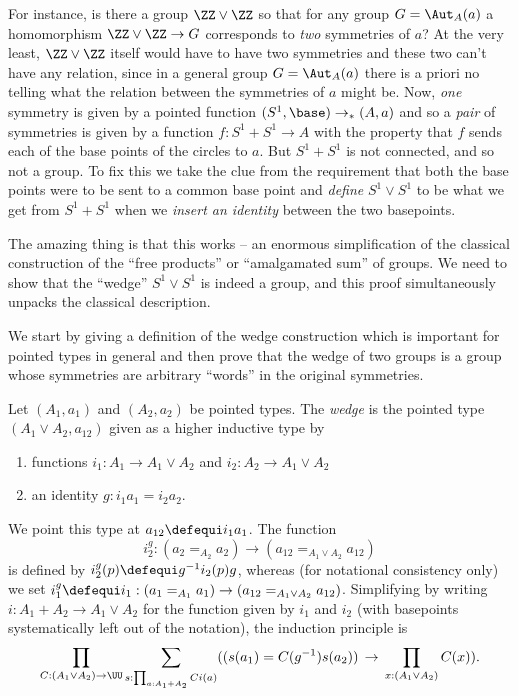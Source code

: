For instance, is there a group $\ZZ\vee\ZZ$ so that for any group $G=\Aut_A(a)$ a homomorphism $\ZZ\vee\ZZ\to G$ corresponds to \emph{two} symmetries of $a$?
At the very least, $\ZZ\vee\ZZ$ itself would have to have two symmetries and these two can't have any relation, since in a general group $G=\Aut_A(a)$ there is a priori no telling what the relation between the symmetries of $a$ might be.
Now, \emph{one} symmetry is given by a pointed function $(S^1,\base)\to_*(A,a)$ and so a \emph{pair} of symmetries is given by a function $f:S^1+S^1\to A$ with the property that $f$ sends each of the base points of the circles to $a$.  But $S^1+S^1$ is not connected, and so not a group.  To fix this we take the clue from the requirement that both the base points were to be sent to a common base point and \emph{define} $S^1\vee S^1$ to be what we get from $S^1+S^1$ when we \emph{insert an identity} between the two basepoints.

The amazing thing is that this works -- an enormous simplification of the classical construction of the ``free products'' or ``amalgamated sum'' of groups.  We need to show that the ``wedge'' $S^1\vee S^1$ is indeed a group, and this proof simultaneously unpacks the classical description.

We start by giving a definition of the wedge construction which is important for pointed types in general and then prove that the wedge of two groups is a group whose symmetries are arbitrary ``words'' in the original symmetries.

\begin{definition}
  \label{def:wedge}
  Let $(A_1,a_1)$ and $(A_2,a_2)$ be pointed types.  The \emph{wedge} is the pointed type $(A_1\vee A_2,a_{12})$ given as a higher inductive type by
  \begin{enumerate}
  \item functions $i_1:A_1\to A_1\vee A_2$ and $i_2:A_2\to A_1\vee A_2$
  \item an identity $g:i_1a_1=i_2a_2$.
  \end{enumerate}
We point this type at $a_{12}\defequi i_1a_1$.
  The function
$$i^g_2:(a_2=_{A_2}a_2)\to(a_{12}=_{A_1\vee A_2}a_{12})$$
is defined by $i^g_2(p)\defequi g^{-1}i_2(p)g$, whereas (for notational consistency only) we set $i_1^g\defequi i_1:(a_1=_{A_1}a_1)\to(a_{12}=_{A_1\vee A_2}a_{12})$.
Simplifying by writing $i:A_1+A_2\to A_1\vee A_2$ for the function given by $i_1$ and $i_2$ (with basepoints systematically left out of the notation),
the induction principle is
$$\prod_{C:(A_1\vee A_2)\to\UU}\sum_{s:\prod_{a:A_1+A_2}Ci(a)}
((s(a_1)=C(g^{-1})s(a_2))\,\to\,\prod_{x:(A_1\vee A_2)}C(x)).$$
\end{definition}

